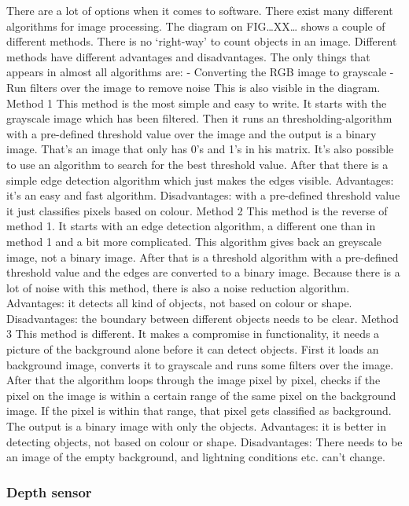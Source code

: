 \documentclass{article}
\begin{document}
There are a lot of options when it comes to software. There exist many different algorithms for image processing. The diagram on FIG…XX… shows a couple of different methods. There is no ‘right-way’ to count objects in an image. Different methods have different advantages and disadvantages. The only things that appears in almost all algorithms are:
-	Converting the RGB image to grayscale
-	Run filters over the image to remove noise
This is also visible in the diagram.
Method 1
This method is the most simple and easy to write. It starts with the grayscale image which has been filtered. Then it runs an thresholding-algorithm with a pre-defined threshold value over the image and the output is a binary image. That’s an image that only has 0’s and 1’s in his matrix.  It’s also possible to use an algorithm to search for the best threshold value.  After that there is a simple edge detection algorithm which just makes the edges visible. 
Advantages: it’s an easy and fast algorithm.
Disadvantages: with a pre-defined threshold value it just classifies pixels based on colour. 
Method 2
This method is the reverse of method 1. It starts with an edge detection algorithm, a different one than in method 1 and a bit more complicated. This algorithm gives back an greyscale image, not a binary image. After that is a threshold algorithm with a pre-defined threshold value and the edges are converted to a binary image. Because there is a lot of noise with this method, there is also a noise reduction algorithm. 
Advantages: it detects all kind of objects, not based on colour or shape.
Disadvantages: the boundary between different objects needs to be clear.
Method 3
This method is different. It makes a compromise in functionality, it needs a picture of the background alone before it can detect objects. First it loads an background image, converts it to grayscale and runs some filters over the image. After that the algorithm loops through the image pixel by pixel, checks if the pixel on the image is within a certain range of the same pixel on the background image. If the pixel is within that range, that pixel gets classified as background. The output is a binary image with only the objects.  
Advantages: it is better in detecting objects, not based on colour or shape.
Disadvantages: There needs to be an image of the empty background, and lightning conditions etc. can’t change.


\subsubsection{Depth sensor}
\end{document}
